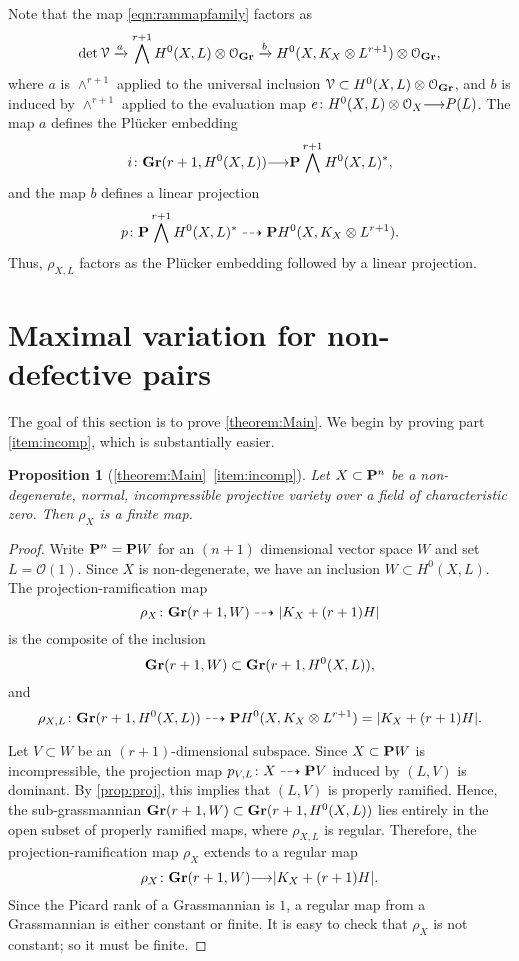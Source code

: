 \documentclass[11pt,reqno]{amsart}
\theoremstyle{plain}
\newtheorem{proposition}[theorem]{Proposition}
\theoremstyle{definition}
\theoremstyle{remark}
\numberwithin{equation}{section}
\renewcommand{\to}{{\longrightarrow}}
\numberwithin{equation}{section}
\renewcommand{\O}{\mathcal O}
\begin{document}
Note that the map \eqref{eqn:rammapfamily} factors as
\[ \det \mathcal V \xrightarrow{a} \bigwedge^{r+1}H^0(X, L) \otimes \O_{\Gr} \xrightarrow{b} H^0(X, K_X \otimes L^{r+1}) \otimes \O_{\Gr},\]
where $a$ is $\wedge^{r+1}$ applied to the universal inclusion $\mathcal V \subset H^0(X, L) \otimes \O_{\Gr}$, and $b$ is induced by $\wedge^{r+1}$ applied to the evaluation map $e \from H^0(X, L) \otimes \O_{X} \to P(L)$.
The map $a$ defines the Pl\"ucker embedding
\[ i \from \Gr(r+1, H^0(X,L)) \to \P \bigwedge^{r+1}H^0(X,L)^*,\]
and the map $b$ defines a linear projection
\[ p \from \P \bigwedge^{r+1}H^0(X,L)^* \dashrightarrow \P H^0(X, K_X \otimes L^{r+1}).\]
Thus, $\rho_{X,L}$ factors as the Pl\"ucker embedding followed by a linear projection.

\section{Maximal variation for non-defective pairs}
\label{sec:proof_of_theorem:main}
The goal of this section is to prove \autoref{theorem:Main}.
We begin by proving part \eqref{item:incomp}, which is substantially easier.
\begin{proposition}[\autoref{theorem:Main}~\eqref{item:incomp}]
  \label{prop:incompress}
  Let $X \subset \P^n$ be a non-degenerate, normal, incompressible projective variety over a field of characteristic zero.
  Then $\rho_X$ is a finite map.
\end{proposition}
\begin{proof}
  Write $\P^n = \P W$ for an $(n+1)$ dimensional vector space $W$ and set $L = \O(1)$.
  Since $X$ is non-degenerate, we have an inclusion $W \subset H^0(X, L)$.
  The projection-ramification map
  \[ \rho_X \from \Gr(r+1, W) \dashrightarrow |K_X + (r+1) H|\]
  is the composite of the inclusion
  \[ \Gr(r+1, W) \subset \Gr(r+1, H^0(X,L)),\]
  and
  \[ \rho_{X,L} \from \Gr(r+1, H^0(X,L)) \dashrightarrow \P H^0(X, K_X \otimes L^{r+1}) = |K_X + (r+1)H|.\]

  Let $V \subset W$ be an $(r+1)$-dimensional subspace.
  Since $X \subset \P W$ is incompressible, the projection map $p_{V,L} \from X \dashrightarrow \P V$ induced by $(L, V)$ is dominant.
  By \autoref{prop:proj}, this implies that $(L, V)$ is properly ramified.
  Hence, the sub-grassmannian $\Gr(r+1, W) \subset \Gr(r+1, H^0(X,L))$ lies entirely in the open subset of properly ramified maps, where $\rho_{X,L}$ is regular.
  Therefore, the projection-ramification map $\rho_X$ extends to a regular map
  \[ \rho_X \from \Gr(r+1, W) \to |K_X + (r+1) H|.\]
  Since the Picard rank of a Grassmannian is $1$, a regular map from a Grassmannian is either constant or finite.
  It is easy to check that $\rho_X$ is not constant; so it must be finite.
\end{proof}
\end{document}
